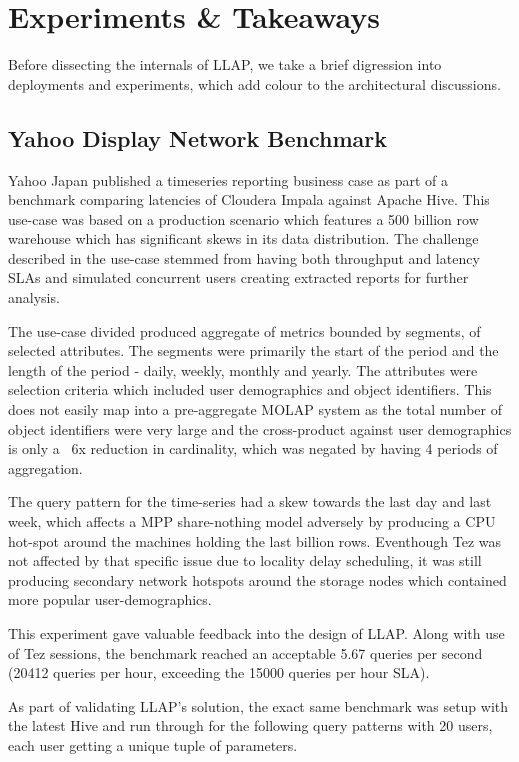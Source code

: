 \section{Experiments \& Takeaways}

Before dissecting the internals of LLAP, we take a brief digression into deployments and experiments, 
which add colour to the architectural discussions. 

\subsection{Yahoo Display Network Benchmark}

Yahoo Japan published a timeseries reporting business case as part of a benchmark\cite{impala_perf} comparing
latencies of Cloudera Impala\cite{impala} against Apache Hive. This use-case was based on a production scenario
which features a 500 billion row warehouse which has significant skews in its data distribution. The challenge 
described in the use-case stemmed from having both throughput and latency SLAs and simulated concurrent users
creating extracted reports for further analysis.

The use-case divided produced aggregate of metrics bounded by segments, of selected attributes. The segments 
were primarily the start of the period and the length of the period - daily, weekly, monthly and yearly. The 
attributes were selection criteria which included user demographics and object identifiers. This does not 
easily map into a pre-aggregate MOLAP system as the total number of object identifiers were very large and 
the cross-product against user demographics is only a ~6x reduction in cardinality, which was negated by having
4 periods of aggregation.

The query pattern for the time-series had a skew towards the last day and last week, which affects a MPP share-nothing
model adversely by producing a CPU hot-spot around the machines holding the last billion rows. Eventhough Tez was not
affected by that specific issue due to locality delay scheduling, it was still producing secondary network hotspots
around the storage nodes which contained more popular user-demographics. 

This experiment gave valuable feedback into the design of LLAP. Along with use of Tez sessions, the benchmark 
reached an acceptable 5.67 queries per second (20412 queries per hour, exceeding the 15000 queries per hour SLA).

As part of validating LLAP's solution, the exact same benchmark was setup with the latest Hive and run through for the following
query patterns with 20 users, each user getting a unique tuple of parameters.

